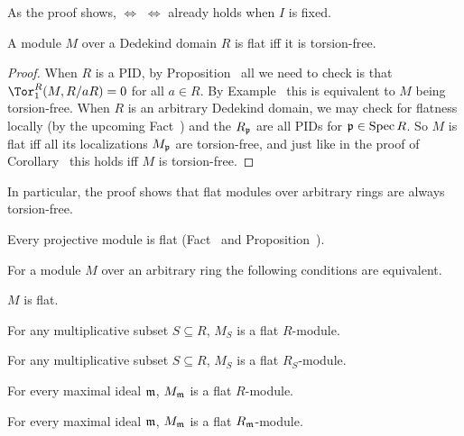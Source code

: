 \documentclass[a4paper,parskip=half,numbers=enddot, DIV=12]{scrreprt}
\begin{document}
\begin{rem*}
	As the proof shows,  $\Leftrightarrow$  $\Leftrightarrow$  already holds when $I$ is fixed.
\end{rem*}
\begin{cor}
	A module $M$ over a Dedekind domain $R$ is flat iff it is torsion-free.
\end{cor}
\begin{proof}
	When $R$ is a PID, by Proposition~ all we need to check is that $\Tor_1^R(M,R/aR)=0$ for all $a\in R$. By Example~ this is equivalent to $M$ being torsion-free. When $R$ is an arbitrary Dedekind domain, we may check for flatness locally (by the upcoming Fact~) and the $R_{\mathfrak{p}}$ are all PIDs for $\mathfrak{p}\in \operatorname{Spec} R$. So $M$ is flat iff all its localizations $M_{\mathfrak{p}}$ are torsion-free, and just like in the proof of Corollary~ this holds iff $M$ is torsion-free.
\end{proof}
\begin{rem*}
	In particular, the proof shows that flat modules over arbitrary rings are always torsion-free.
\end{rem*}
\begin{example}
	Every projective module is flat (Fact~ and Proposition~).
\end{example}
\begin{fact}
	For a module $M$ over an arbitrary ring the following conditions are equivalent.
	\begin{alphanumerate}
		\item $M$ is flat.
		\item For any multiplicative subset $S\subseteq R$, $M_S$ is a flat $R$-module.
		\item For any multiplicative subset $S\subseteq R$, $M_S$ is a flat $R_S$-module.
		\item For every maximal ideal $\mathfrak{m}$, $M_{\mathfrak{m}}$ is a flat $R$-module.
		\item For every maximal ideal $\mathfrak{m}$, $M_{\mathfrak{m}}$ is a flat $R_{\mathfrak{m}}$-module.
	\end{alphanumerate}
\end{fact}
\end{document}
